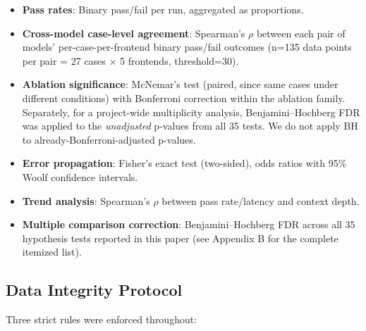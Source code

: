 \documentclass{article}
\begin{document}
\begin{itemize}



\item

  \textbf{Pass rates}: Binary pass/fail per run, aggregated as proportions.

\item

  \textbf{Cross-model case-level agreement}: Spearman's $\rho$ between each pair of models' per-case-per-frontend binary pass/fail outcomes (n=135 data points per pair = 27 cases $\times$ 5 frontends, threshold=30).

\item

  \textbf{Ablation significance}: McNemar's test (paired, since same cases under different conditions) with Bonferroni correction within the ablation family. Separately, for a project-wide multiplicity analysis, Benjamini--Hochberg FDR was applied to the \emph{unadjusted} p-values from all 35 tests. We do not apply BH to already-Bonferroni-adjusted p-values.

\item

  \textbf{Error propagation}: Fisher's exact test (two-sided), odds ratios with 95\% Woolf confidence intervals.

\item

  \textbf{Trend analysis}: Spearman's $\rho$ between pass rate/latency and context depth.

\item

  \textbf{Multiple comparison correction}: Benjamini--Hochberg FDR across all 35 hypothesis tests reported in this paper (see Appendix B for the complete itemized list).

\end{itemize}



\subsection{Data Integrity Protocol}\label{data-integrity-protocol}



Three strict rules were enforced throughout:
\end{document}
